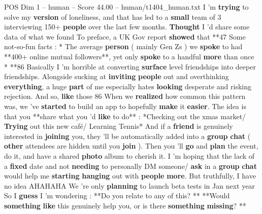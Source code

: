 \begin{textsample}{POS Dim 1 – human – Score 44.00 – human/t1404\_human.txt}  \label{ex:f1_pos_036}
I 'm \textbf{trying} to solve my \textbf{version} of loneliness, and that has led to a \textbf{small} team of 3 interviewing 150+ \textbf{people} over the last few months. \textbf{Thought} I 'd share some data of what we found To preface, a UK Gov report \textbf{showed} that **47%
Some not-so-fun facts : * The average \textbf{person} ( mainly Gen Zs ) we \textbf{spoke} to had **400+ online mutual followers**, yet only \textbf{spoke} to a handful \textbf{more} than once * **86%
Basically I 'm horrible at converting \textbf{surface} level friendships into deeper friendships.
Alongside sucking at \textbf{inviting} \textbf{people} out and overthinking \textbf{everything}, a huge \textbf{part} of me especially hates \textbf{looking} desperate and risking rejection.
And so, \textbf{like} those 86 %
When we \textbf{realized} how common this pattern was, we 've \textbf{started} to build an app to hopefully \textbf{make} it \textbf{easier}.
The idea is that you **share what you 'd \textbf{like} to do** : *Checking out the xmas market/ \textbf{Trying} out this new café/ Learning Tennis* And if a \textbf{friend} is genuinely interested in \textbf{joining} you, they 'll be automatically added into a \textbf{group} \textbf{chat} ( \textbf{other} attendees are hidden until you \textbf{join} ).
Then you 'll \textbf{go} and \textbf{plan} the event, do it, and have a shared \textbf{photo} album to cherish it.
I 'm hoping that the lack of a \textbf{fixed} date and not \textbf{needing} to personally DM someone/ \textbf{ask} in a \textbf{group} \textbf{chat} would help me \textbf{starting} \textbf{hanging} out with \textbf{people} \textbf{more}.
But truthfully, I have no idea AHAHAHA We 're only \textbf{planning} to launch beta tests in Jan next year So I \textbf{guess} I ’m wondering : **Do you relate to any of this? ** **Would \textbf{something} \textbf{like} this genuinely help you, or is there \textbf{something} \textbf{missing}? **

\end{textsample}
